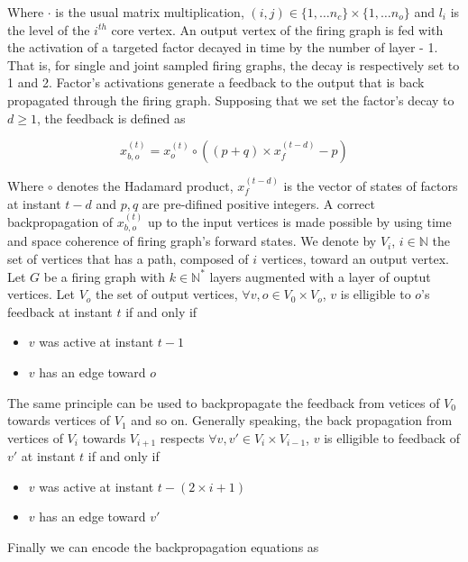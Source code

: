 \documentclass[a4paper, 11pt]{article}
\begin{document}
Where $\cdot$ is the usual matrix multiplication, $(i, j) \in \{1, \ldots n_c\} \times \{1, \ldots n_o\}$ and $l_i$ is the level of the $i^{th}$ core vertex. An output vertex of the firing graph is fed with the activation of a targeted factor decayed in time by the number of layer - 1. That is, for single and joint sampled firing graphs, the decay is respectively set to 1 and 2. Factor's activations generate a feedback to the output that is back propagated through the firing graph. Supposing that we set the factor's decay to $d \geq 1$, the feedback is defined as 

\begin{equation*}
x_{b,o}^{(t)} = x_o^{(t)} \circ \left( (p + q) \times x_f^{(t-d)} - p \right)
\end{equation*}

Where $\circ$ denotes the Hadamard product, $x_f^{(t-d)}$ is the vector of states of factors at instant $t-d$ and $p, q$ are pre-difined positive integers. A correct backpropagation of $x_{b,o}^{(t)}$ up to the input vertices is made possible by using time and space coherence of firing graph's forward states. We denote by $V_i$, $i\in \mathbb{N}$ the set of vertices that has a path, composed of $i$ vertices, toward an output vertex. Let $G$ be a firing graph with $k \in \mathbb{N}^{*}$ layers augmented with a layer of ouptut vertices. Let $V_o$ the set of output vertices, $\forall v, o \in V_0 \times V_o$,  $v$ is elligible to $o$'s feedback at instant $t$ if and only if 

\begin{itemize}
\item $v$ was active at instant $t-1$
\item $v$ has an edge toward $o$
\end{itemize}    

The same principle can be used to backpropagate the feedback from vetices of $V_0$ towards vertices of $V_1$ and so on. Generally speaking, the back propagation from vertices of $V_i$ towards $V_{i+1}$ respects  $\forall v, v' \in V_{i} \times V_{i-1}$,  $v$ is elligible to feedback of $v'$ at instant $t$ if and only if 

\begin{itemize}
\item $v$ was active at instant $t - (2 \times i + 1)$
\item $v$ has an edge toward $v'$
\end{itemize}    

Finally we can encode the backpropagation equations as
\end{document}
